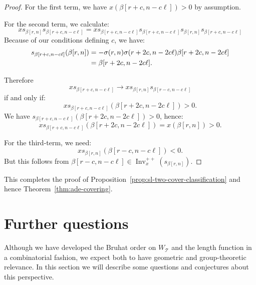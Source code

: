 \documentclass[ALCO,ThmDefs,Unicode]{cedram}
\DeclareMathOperator{\Inv}{Inv}
\newcommand{\cT}{\mathcal{T}}
\newcommand{\WTits}{W_{\TitsCone}}
\newcommand{\TitsCone}{\cT}
\newcommand{\Invplusplusx}{\Inv^{++}_x}
\begin{document}
\begin{proof}
For the first term, we have $x(\beta[r+c, n- c\ell]) > 0$ by assumption.

For the second term, we calculate:
\begin{equation}\label{eq:84}
x s_{\beta[r,n]} s_{\beta[r+c, n- c\ell]} = x s_{\beta[r+c, n- c\ell]} s_{\beta[r+c, n- c\ell]} s_{\beta[r,n]} s_{\beta[r+c, n- c\ell]}
\end{equation}
Because of our conditions defining $c$, we have:
\begin{align}\label{eq:87}
s_{\beta[r+c, n- c\ell]}(\beta[r,n]) &= - \sigma(r,n) \sigma(r+2c,n-2c \ell) \beta[r+2c,n-2c \ell]\\\notag &= \beta[r+2c,n-2c \ell].
\end{align}

Therefore
\begin{equation}\label{eq:88}
x s_{\beta[r+c, n- c\ell]} \rightarrow x s_{\beta[r,n]} s_{\beta[r-c, n- c\ell]}
\end{equation}
if and only if:
\begin{equation}\label{eq:89}
x s_{\beta[r+c,n-c\ell]}(\beta[r+2c,n-2c \ell]) > 0.
\end{equation}
We have $ s_{\beta[r+c,n-c\ell]}(\beta[r+2c,n-2c \ell]) > 0$, hence:
\begin{equation}\label{eq:90}
x s_{\beta[r+c,n-c\ell]}(\beta[r+2c,n-2c \ell]) = x(\beta[r,n]) > 0.
\end{equation}

For the third-term, we need:
\begin{equation}\label{eq:91}
x s_{\beta[r,n]} (\beta[r-c, n- c\ell]) < 0.
\end{equation}
But this follows from $\beta[r-c,n-c\ell] \in \Invplusplusx(s_{\beta[r,n]})$.
\end{proof}

This completes the proof of Proposition~\ref{prop:sl-two-cover-classification} and hence Theorem~\ref{thm:ade-covering}.


\section{Further questions}\label{sec:further-questions}

Although we have developed the Bruhat order on $\WTits$ and the length function in a combinatorial fashion, we expect both to have geometric and group-theoretic relevance. In this section we will describe some questions and conjectures about this perspective.
\end{document}
